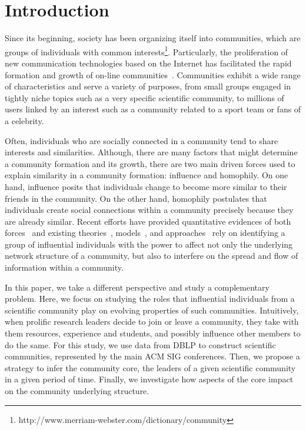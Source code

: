 \section{Introduction}

Since its beginning, society has been organizing itself into communities, which are groups of individuals with common interests\footnote{http://www.merriam-webster.com/dictionary/community}.
Particularly, the proliferation of new communication technologies based on the Internet has facilitated the rapid formation and growth of on-line communities~\cite{Kleinberg@cacm2008}. 
Communities exhibit a wide range of characteristics and serve a variety of purposes, from small groups engaged in tightly niche topics such as a very specific scientific community, 
to millions of users linked by an interest such as a community related to a sport team or fans of a celebrity. 

Often, individuals who are socially connected in a community tend to share interests and similarities. Although, there are many factors that might determine a community formation
and its growth, there are two main driven forces used to explain similarity in a community formation: influence and homophily. On one hand, influence posits that individuals change
to become more similar to their friends in the community. On the other hand, homophily postulates that individuals create social connections within a community precisely because
they are already similar. Recent efforts have provided quantitative evidences of both forces~\cite{icwsm10cha,crandall.kdd08,Backstrom:2006,influence.correlation.kdd08} and
existing theories~\cite{Rogers.1962,accidental-influential}, models~\cite{kempe03kdd,Kempe05influentialnodes}, and
approaches~\cite{saez-trumper@kdd12,Weng:2010:TFT:1718487.1718520} rely on identifying a group of influential individuals with the power to affect not only the underlying network
structure of a community, but also to interfere on the spread and flow of information within a community. 

In this paper, we take a different perspective and study a complementary problem. Here, we focus on studying the roles that influential individuals from a scientific community play
on evolving properties of such communities. Intuitively, when prolific research leaders decide to join or leave a community, they take with them resources,
experience and students, and possibly influence other members to do the same. For this study, we use data from DBLP to construct scientific communities, represented by the 
main ACM SIG conferences. Then, we propose a strategy to infer the community core, the leaders of a given scientific community in a given period of time. 
Finally, we investigate how aspects of the core impact on the community underlying structure. 

